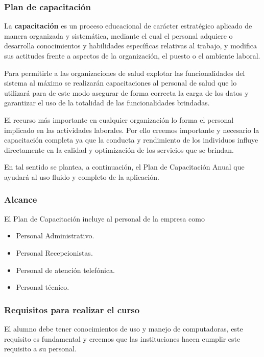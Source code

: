 \documentclass[a4paper,12pt]{article}
\begin{document}
\subsubsection{Plan de capacitación}
La \textbf{capacitación} es un proceso educacional de carácter estratégico aplicado de
manera organizada y sistemática, mediante el cual el personal adquiere o desarrolla
conocimientos y habilidades específicas relativas al trabajo, y modifica sus actitudes
frente a aspectos de la organización, el puesto o el ambiente laboral.

Para permitirle a las organizaciones de salud explotar las funcionalidades del sistema al máximo se realizarán capacitaciones al personal de salud que lo utilizará para de este modo asegurar de forma correcta la carga de los datos y garantizar el uso de la totalidad de las funcionalidades brindadas.



El recurso más importante en cualquier organización lo forma el personal implicado
en las actividades laborales. Por ello creemos importante y necesario la capacitación completa ya que  la conducta y rendimiento de los individuos influye
directamente en la calidad y optimización de los servicios que se brindan.



En tal sentido se plantea, a continuación, el Plan de Capacitación Anual que ayudará al uso fluido y completo de la aplicación.
\subsubsection{Alcance}
El Plan de Capacitación incluye al personal de la empresa como
    \begin{itemize}
        \item Personal Administrativo.
        \item Personal Recepcionistas.
        \item Personal de atención telefónica.
        \item Personal técnico.
    \end{itemize}
\subsubsection{Requisitos para realizar el curso}
	El alumno debe tener conocimientos de uso y manejo de computadoras, este requisito es fundamental y creemos que las instituciones hacen cumplir este requisito a su personal.
\end{document}
